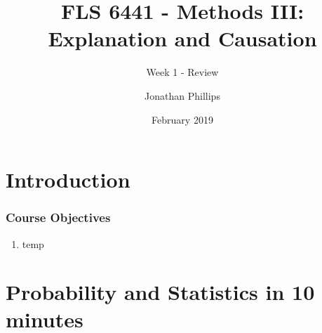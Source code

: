 \documentclass[xcolor=x11names,compress]{beamer}\usepackage[]{graphicx}\usepackage[]{color}
\title{FLS 6441 - Methods III: Explanation and Causation}
\subtitle{Week 1 - Review}
\author{Jonathan Phillips}
\date{February 2019}
\renewcommand{\(}{\begin{columns}}
\renewcommand{\)}{\end{columns}}
\newcommand{\<}[1]{\begin{column}{#1}}
\renewcommand{\>}{\end{column}}
\begin{document}
\frame{\titlepage}

\section{Introduction}

\begin{frame}
\frametitle{Course Objectives}
\begin{enumerate}
\item temp
\end{enumerate}
\end{frame}

\section{Probability and Statistics in 10 minutes}
\end{document}
